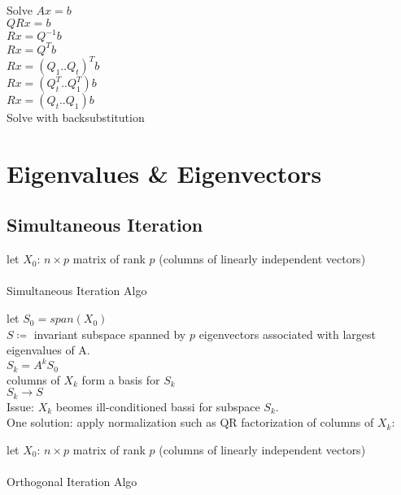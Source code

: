 \documentclass[8pt,letter]{article}
\begin{document}
\begin{multicols*}{2}
    Solve $Ax=b$\\
    $QRx = b$\\
    $Rx = Q^{-1}b$\\
    $Rx = Q^T b$\\
    $Rx = (Q_1 .. Q_t)^T b$\\    
    $Rx = (Q_t^T .. Q_1^T) b$\\
    $Rx = (Q_t .. Q_1) b$\\
    Solve with backsubstitution\\

    \vfill\null
    \pagebreak
    
    \section{Eigenvalues & Eigenvectors}
    
    \subsection{Simultaneous Iteration}
    
    \begin{algorithm}[H]
      let $X_0$: $n \times p$ matrix of rank $p$ (columns of linearly independent vectors)\\
      \\
      \caption{Simultaneous Iteration Algo \label{Algo_simultaneous_iteration}}
    \end{algorithm}    

    let $S_0 = span(X_0)$\\
    $S \coloneqq$ invariant subspace spanned by $p$ eigenvectors associated with largest eigenvalues of A.\\
    $S_k = A^k S_0$\\
    columns of $X_k$ form a basis for $S_k$\\
    $S_k \rightarrow S$\\

    Issue: $X_k$ beomes ill-conditioned bassi for subspace $S_k$.\\
    One solution: apply normalization such as QR factorization of columns of $X_k$:
    
    \begin{algorithm}[H]
      let $X_0$: $n \times p$ matrix of rank $p$ (columns of linearly independent vectors)\\
      \\
      \caption{Orthogonal Iteration Algo \label{Algo_orthogonal_iteration}}
    \end{algorithm}


\end{multicols*}
\end{document}
